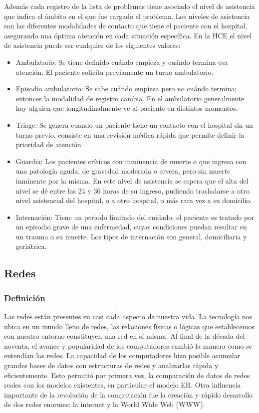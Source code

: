 Además cada registro de la lista de problemas tiene asociado el nivel de asistencia que indica el ámbito en el que fue cargado el problema. Los niveles de asistencia son las diferentes modalidades de contacto que tiene el paciente con el hospital, asegurando una óptima atención en cada situación específica. En la \acrshort{HCE} el nivel de asistencia puede ser cualquier de los siguientes valores:

\begin{itemize}
\item Ambulatorio: Se tiene definido cuándo empieza y cuándo termina esa atención. El paciente solicita previamente un turno ambulatorio.
\item Episodio ambulatorio: Se sabe cuándo empieza pero no cuándo termina; entonces la modalidad de registro cambia. En el ambulatorio generalmente hay alguien que longitudinalmente ve al paciente en distintos momentos.
\item Triage: Se genera cuando un paciente tiene un contacto con el hospital sin un turno previo, consiste en una revisión médica rápida que permite definir la prioridad de atención.
\item Guardia: Los pacientes críticos con inminencia de muerte o que ingresa con una patología aguda, de gravedad moderada o severa, pero sin muerte inminente por la misma. En este nivel de asistencia se espera que el alta del nivel se dé entre las 24 y 36 horas de su ingreso, pudiendo trasladarse a otro nivel asistencial del hospital, o a otro hospital, o más rara vez a su domicilio.
\item Internación: Tiene un periodo limitado del cuidado, el paciente es tratado por un episodio grave de una enfermedad, cuyas condiciones puedan resultar en un trauma o su muerte. Los tipos de internación son general, domiciliaria y geriátrica.
\end{itemize}


\subsection{Redes}
\subsubsection{Definición}
Las redes están presentes en casi cada aspecto de nuestra vida. La tecnología nos ubica en un mundo lleno de redes, las relaciones físicas o lógicas que establecemos con nuestro entorno constituyen una red en sí misma. Al final de la década del noventa, el avance y popularidad de los computadores cambió la manera como se entendían las redes. La capacidad de los computadores hizo posible acumular grandes bases de datos con estructuras de redes y analizarlas rápida y eficientemente. Esto permitió por primera vez, la comparación de datos de redes reales con los modelos existentes, en particular el modelo ER. Otra influencia importante de la revolución de la computación fue la creación y rápido desarrollo de dos redes enormes: la internet y la World Wide Web (WWW). 

